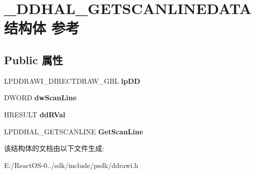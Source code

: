 \hypertarget{struct___d_d_h_a_l___g_e_t_s_c_a_n_l_i_n_e_d_a_t_a}{}\section{\+\_\+\+D\+D\+H\+A\+L\+\_\+\+G\+E\+T\+S\+C\+A\+N\+L\+I\+N\+E\+D\+A\+T\+A结构体 参考}
\label{struct___d_d_h_a_l___g_e_t_s_c_a_n_l_i_n_e_d_a_t_a}
\subsection*{Public 属性}
\begin{DoxyCompactItemize}
\item 
\mbox{\label{struct___d_d_h_a_l___g_e_t_s_c_a_n_l_i_n_e_d_a_t_a_a6c3e621f05b09e1231b95875632e0e5e}} 
L\+P\+D\+D\+R\+A\+W\+I\+\_\+\+D\+I\+R\+E\+C\+T\+D\+R\+A\+W\+\_\+\+G\+BL {\bfseries lp\+DD}
\item 
\mbox{\label{struct___d_d_h_a_l___g_e_t_s_c_a_n_l_i_n_e_d_a_t_a_a66f954b14e8086f8b06b91edec159c5c}} 
D\+W\+O\+RD {\bfseries dw\+Scan\+Line}
\item 
\mbox{\label{struct___d_d_h_a_l___g_e_t_s_c_a_n_l_i_n_e_d_a_t_a_ac495bbc2bc71b936005210ae19582482}} 
H\+R\+E\+S\+U\+LT {\bfseries dd\+R\+Val}
\item 
\mbox{\label{struct___d_d_h_a_l___g_e_t_s_c_a_n_l_i_n_e_d_a_t_a_a6372d1f21b7e7ae9aea24274e9c553ad}} 
L\+P\+D\+D\+H\+A\+L\+\_\+\+G\+E\+T\+S\+C\+A\+N\+L\+I\+NE {\bfseries Get\+Scan\+Line}
\end{DoxyCompactItemize}


该结构体的文档由以下文件生成\+:\begin{DoxyCompactItemize}
\item 
E\+:/\+React\+O\+S-\/0../sdk/include/psdk/ddrawi.\+h\end{DoxyCompactItemize}
